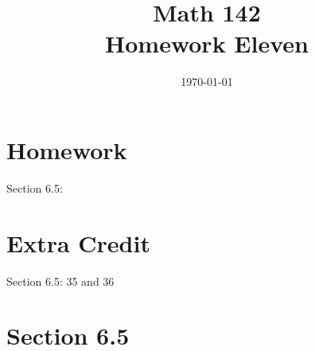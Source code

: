 \documentclass{exam}
\author{}
\date{\today}
\title{Math 142 \\ Homework Eleven}
\begin{document}
  \maketitle

  \section{Homework}
  Section 6.5: 

  \section{Extra Credit}
  Section 6.5: 35 and 36

  \ifprintanswers

    \section{Section 6.5}
\end{document}

